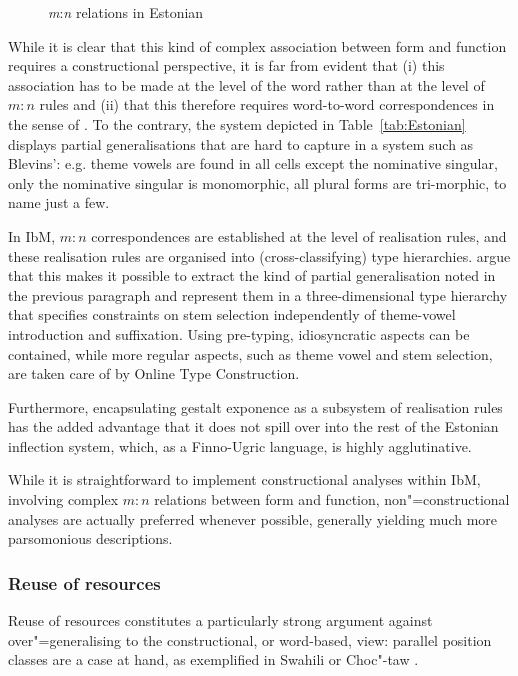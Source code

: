 \documentclass[output=paper
	        ,collection
	        ,collectionchapter
 	        ,biblatex
                ,babelshorthands
                ,newtxmath
                ,draftmode
                ,colorlinks, citecolor=brown
]{langscibook}
\begin{document}
\begin{exe}
\begin{xlist}
\begin{exe}
\begin{xlist}
\begin{figure}[htb]
         
        

      \caption{\emph{m}:\emph{n} relations in Estonian}
      \label{fig:Matthews}
\end{figure}

While it is clear that this kind of complex association between form
and function requires a constructional perspective, it is far from
evident that (i) this association has to be made at the level of the word
rather than at the level of $m:n$ rules and
(ii) that this therefore requires word-to-word correspondences in the sense of
\citet{Blevins05,Blevins14}. To the contrary, the system depicted in
Table~\ref{tab:Estonian} displays partial generalisations that are
hard to capture in a system such as Blevins': e.g. theme vowels are
found in all cells except the nominative singular, only the nominative
singular is monomorphic, all plural forms are tri-morphic, to name
just a few.  

In IbM, $m:n$ correspondences are established at the level of
realisation rules, and these realisation rules are organised into
(cross-classifying) type
hierarchies. \citet{Crysmann:Bonami:2017:HPSG} argue that this makes
it possible to extract the kind of partial generalisation noted in the
previous paragraph and represent them in a three-dimensional type
hierarchy that specifies constraints on stem selection independently
of theme-vowel introduction and suffixation. Using pre-typing,
idiosyncratic aspects can be contained, while more regular aspects,
such as theme vowel and stem selection, are taken care of by Online
Type Construction.

Furthermore, encapsulating gestalt exponence as a subsystem of
realisation rules has the added advantage that it does not spill over
into the rest of the Estonian inflection system, which, as a
Finno-Ugric language,  is highly agglutinative.


While it is straightforward to implement constructional analyses
within IbM, involving complex $m:n$ relations between form and
function, non"=constructional analyses are actually preferred whenever
possible, generally yielding much more parsomonious descriptions.

\subsubsection{Reuse of resources}

Reuse of resources constitutes a particularly strong argument
against over"=generalising to the constructional, or word-based, view: parallel
position classes are a case at hand, as exemplified in Swahili
\citep{Stump93,Crysmann:Bonami:2016} or Choc"-taw \citep{broadwell:2017}. 


\end{xlist}
\end{exe}
\end{xlist}
\end{exe}
\end{document}

